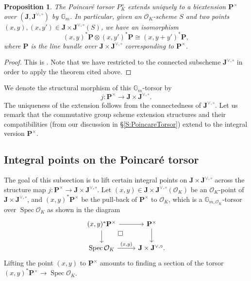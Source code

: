 \documentclass[11pt,oneside]{amsart}
\theoremstyle{plain}
\newtheorem{proposition}[theorem]{Proposition}
\theoremstyle{definition}
\def\G{{\bf G}}
\DeclareMathOperator{\spec}{Spec} \DeclareMathOperator{\sgn}{sign}
\def\J{\mathbf{J}}
\def\Jo{\mathbf{J}^{\vee,\circ}}
\def\G{\mathbb{G}}
\def\P{\mathbf{P}}
\def\ra{\rightarrow}
\def\oh{\mathcal{O}}
\begin{document}
\begin{proposition} 
The Poincar\'e torsor $P_K^{\times}$ extends uniquely to a biextension $\P^\times$ over $(\J, \Jo)$ by $\G_m$. In particular, given an $\oh_K$-scheme $S$ and two points $(x, y), (x, y') \in \J\times \Jo(S)$, we have an isomorphism 
\begin{equation}\label{isom:cube}
 (x, y)^* \P \otimes (x, y')^* \P \cong (x, y+ y')^* \P,
 \end{equation}
where $\P$ is the line bundle over $\J \times \Jo$ corresponding to $\P^\times$. 
\end{proposition} 

\begin{proof}
This is \cite[VIII. Theorem 7.1(b)]{SGA7}. Note that we have restricted to the connected subscheme $\Jo$ in order to apply the theorem cited above. 
\end{proof}

We denote the structural morphism of this $\G_m$-torsor by 
$$j : \P^{\times}\rightarrow \J\times \Jo. $$ 
The uniqueness of the extension follows from the connectedness of $\Jo$. Let us remark that the commutative group scheme extension structures and their compatibilities (from our discussion in  \S \ref{S:PoincareTorsor}) extend to the integral version $\P^\times$. 
 






\subsection{Integral points on the Poincar\'e torsor}\label{S:lifting}

The goal of this subsection is to lift certain integral points on $\J \times \Jo$ across the structure map $j: \P^\times \ra \J \times \Jo$. Let $(x, y)\in \J\times \Jo(\oh_K)$ be an $\oh_K$-point of $\J\times \Jo$, and  $(x, y)^* \P^{\times}$ be the pull-back of $\P^{\times}$ to $\oh_K$, which is a $\G_{m, \oh_K}$-torsor over $\spec \oh_K$ as shown in the diagram
\begin{equation}\label{diag:lift}
\begin{tikzcd}
(x, y)^* \P^\times\arrow{r}\arrow{d} \arrow[dr, phantom, near start, "\square"]
  & \P^\times  \arrow{d} \\
  \spec \oh_K \arrow{r}{(x, y)}
  & \J\times  \Jo.
\end{tikzcd}
\end{equation}
Lifting the point $(x, y)$ to $\P^\times$ amounts to finding a section of the torsor $(x, y)^* \P^\times \ra \spec \oh_K$. 
\end{document}
